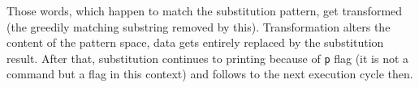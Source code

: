 Those words, which happen to match the substitution pattern,
get transformed (the greedily matching substring removed
by this).
Transformation alters the content of the pattern space,
data gets entirely replaced by the substitution result.
After that, substitution continues to printing because of
\lstinline{p} flag (it is not a command but a flag in this
context) and follows to the next execution cycle then.
